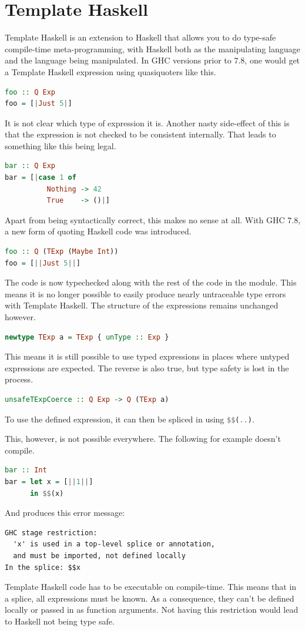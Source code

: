 \documentclass[a4paper,bibliography=totocnumbered,parskip,headsepline]{scrbook}
\begin{document}
\section{Template Haskell}
Template Haskell is an extension to Haskell that allows you to do type-safe compile-time meta-programming, with Haskell both as the manipulating language and the language being manipulated.
In GHC versions prior to 7.8, one would get a Template Haskell expression using quasiquoters like this.
\begin{lstlisting}[language=haskell]
foo :: Q Exp
foo = [|Just 5|]
\end{lstlisting}
It is not clear which type of expression it is.
Another nasty side-effect of this is that the expression is not checked to be consistent internally.
That leads to something like this being legal.
\begin{lstlisting}[language=haskell]
bar :: Q Exp
bar = [|case 1 of
          Nothing -> 42
          True    -> ()|]
\end{lstlisting}
Apart from being syntactically correct, this makes no sense at all.
With GHC 7.8, a new form of quoting Haskell code was introduced.
\begin{lstlisting}[language=haskell]
foo :: Q (TExp (Maybe Int))
foo = [||Just 5||]
\end{lstlisting}
The code is now typechecked along with the rest of the code in the module.
This means it is no longer possible to easily produce nearly untraceable type errors with Template Haskell.
The structure of the expressions remains unchanged however.
\begin{lstlisting}[language=haskell]
newtype TExp a = TExp { unType :: Exp }
\end{lstlisting}
This means it is still possible to use typed expressions in places where untyped expressions are expected.
The reverse is also true, but type safety is lost in the process.
\begin{lstlisting}[language=haskell]
unsafeTExpCoerce :: Q Exp -> Q (TExp a)
\end{lstlisting}
To use the defined expression, it can then be spliced in using \lstinline[language=haskell]{$$(..)}.

This, however, is not possible everywhere.
The following for example doesn't compile.
\begin{lstlisting}[language=haskell]
bar :: Int
bar = let x = [||1||]
      in $$(x)
\end{lstlisting}
And produces this error message:
\begin{verbatim}
GHC stage restriction:
  'x' is used in a top-level splice or annotation,
  and must be imported, not defined locally
In the splice: $$x
\end{verbatim}
Template Haskell code has to be executable on compile-time.
This means that in a splice, all expressions must be known.
As a consequence, they can't be defined locally or passed in as function arguments.
Not having this restriction would lead to Haskell not being type safe.
\end{document}
